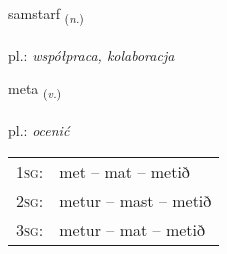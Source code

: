 \documentclass[frontgrid, backgrid]{flacards}\usepackage[]{graphicx}\usepackage[]{xcolor}
\begin{document}
\renewcommand{\flhead}{\vskip5pt \fboxsep=0pt {\small\bfseries\footnotesize Nafnorð | rzeczownik}}
\renewcommand{\fcfoot}{\vskip5pt \fboxsep=0pt \hspace{2pt}{\small\bfseries\footnotesize 1K}}

\renewcommand{\blhead}{\vskip5pt {\small\bfseries\footnotesize Nafnorð | rzeczownik }}
\renewcommand{\bcfoot}{\vskip5pt \hspace{2pt}{\small\bfseries\footnotesize 1K}}


{samstarf \small{\textsubscript{(\textit{n.})}} \\[1ex] %
\textphonetic{[samstarf]} \\
pl.: \emph{współpraca, kolaboracja} \\  [2ex]
\renewcommand*{\arraystretch}{0.8}
}

\renewcommand{\flhead}{\vskip5pt \fboxsep=0pt {\small\bfseries\footnotesize Sagnorð | czasownik}}
\renewcommand{\fcfoot}{\vskip5pt \fboxsep=0pt \hspace{2pt}{\small\bfseries\footnotesize 1K}}

\renewcommand{\blhead}{\vskip5pt {\small\bfseries\footnotesize Sagnorð | czasownik }}
\renewcommand{\bcfoot}{\vskip5pt \hspace{2pt}{\small\bfseries\footnotesize 1K}}


{meta \small{\textsubscript{(\textit{v.})}} \\[1ex] %
\textphonetic{[mɛːta]} \\
pl.: \emph{ocenić} \\  [2ex]
\renewcommand*{\arraystretch}{0.8}
\begin{tabular}{p{1cm}l}
\textsc{1sg}: & met -- mat -- metið \\ 
\textsc{2sg}: & metur -- mast -- metið \\ 
\textsc{3sg}: & metur -- mat -- metið \\ 
\end{tabular}
}
\end{document}
